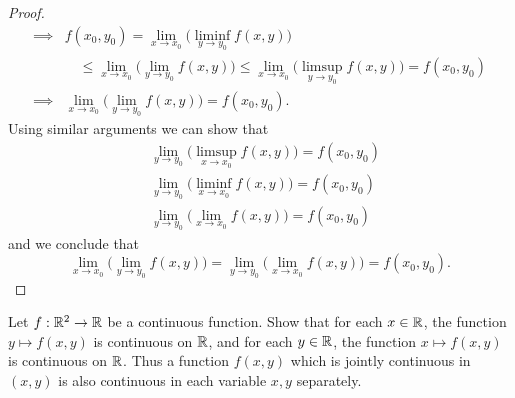\begin{proof}
\begin{align*}
    \implies & f(x_0, y_0) = \lim_{x \to x_0} \big(\liminf_{y \to y_0} f(x, y)\big)                                                                     \\
             & \quad \leq \lim_{x \to x_0} \big(\lim_{y \to y_0} f(x, y)\big) \leq \lim_{x \to x_0} \big(\limsup_{y \to y_0} f(x, y)\big) = f(x_0, y_0) \\
    \implies & \lim_{x \to x_0} \big(\lim_{y \to y_0} f(x, y)\big) = f(x_0, y_0).
  \end{align*}
  Using similar arguments we can show that
  \begin{align*}
     & \lim_{y \to y_0} \big(\limsup_{x \to x_0} f(x, y)\big) = f(x_0, y_0) \\
     & \lim_{y \to y_0} \big(\liminf_{x \to x_0} f(x, y)\big) = f(x_0, y_0) \\
     & \lim_{y \to y_0} \big(\lim_{x \to x_0} f(x, y)\big) = f(x_0, y_0)
  \end{align*}
  and we conclude that
  \[
    \lim_{x \to x_0} \big(\lim_{y \to y_0} f(x, y)\big) = \lim_{y \to y_0} \big(\lim_{x \to x_0} f(x, y)\big) = f(x_0, y_0).
  \]
\end{proof}

\begin{ex}\label{ii:ex:2.2.10}
  Let \(f : \mathbb{R}^2 \to \mathbb{R}\) be a continuous function.
  Show that for each \(x \in \mathbb{R}\), the function \(y \mapsto f(x, y)\) is continuous on \(\mathbb{R}\), and for each \(y \in \mathbb{R}\), the function \(x \mapsto f(x, y)\) is continuous on \(\mathbb{R}\).
  Thus a function \(f(x, y)\) which is jointly continuous in \((x, y)\) is also continuous in each variable \(x, y\) separately.
\end{ex}

